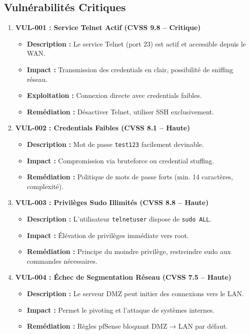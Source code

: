\documentclass[12pt,a4paper,openany]{report}
\begin{document}
	\subsection{Vulnérabilités Critiques}
	
	\begin{enumerate}
		\item \textbf{VUL-001 : Service Telnet Actif (CVSS 9.8 -- Critique)}
		\begin{itemize}
			\item \textbf{Description :} Le service Telnet (port 23) est actif et accessible depuis le WAN.
			\item \textbf{Impact :} Transmission des credentials en clair, possibilité de sniffing réseau.
			\item \textbf{Exploitation :} Connexion directe avec credentials faibles.
			\item \textbf{Remédiation :} Désactiver Telnet, utiliser SSH exclusivement.
		\end{itemize}
		
		\item \textbf{VUL-002 : Credentials Faibles (CVSS 8.1 -- Haute)}
		\begin{itemize}
			\item \textbf{Description :} Mot de passe \texttt{test123} facilement devinable.
			\item \textbf{Impact :} Compromission via bruteforce ou credential stuffing.
			\item \textbf{Remédiation :} Politique de mots de passe forts (min. 14 caractères, complexité).
		\end{itemize}
		
		\item \textbf{VUL-003 : Privilèges Sudo Illimités (CVSS 8.8 -- Haute)}
		\begin{itemize}
			\item \textbf{Description :} L'utilisateur \texttt{telnetuser} dispose de \texttt{sudo ALL}.
			\item \textbf{Impact :} Élévation de privilèges immédiate vers root.
			\item \textbf{Remédiation :} Principe du moindre privilège, restreindre sudo aux commandes nécessaires.
		\end{itemize}
		
		\item \textbf{VUL-004 : Échec de Segmentation Réseau (CVSS 7.5 -- Haute)}
		\begin{itemize}
			\item \textbf{Description :} Le serveur DMZ peut initier des connexions vers le LAN.
			\item \textbf{Impact :} Permet le pivoting et l'attaque de systèmes internes.
			\item \textbf{Remédiation :} Règles pfSense bloquant DMZ → LAN par défaut.
		\end{itemize}
	\end{enumerate}
	
\end{document}
